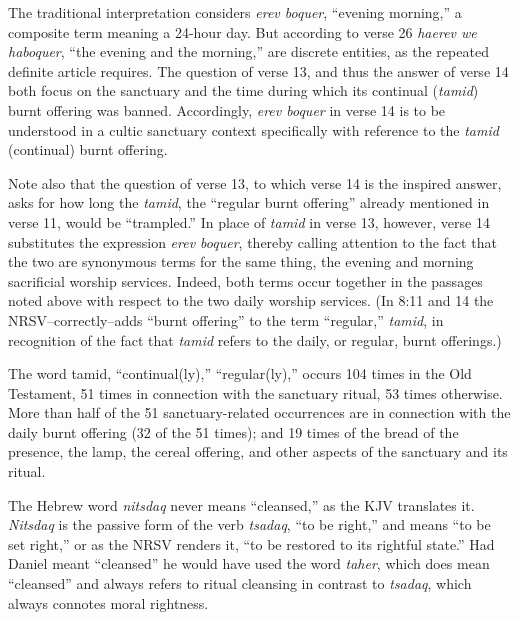 The traditional interpretation considers \textit{erev boquer}, ``evening morning,'' a
composite term meaning a 24-hour day. But according to verse 26 \textit{haerev we
haboquer}, ``the evening and the morning,'' are discrete entities, as the
repeated definite article requires. The question of verse 13, and thus the
answer of verse 14 both focus on the sanctuary and the time during which its
continual (\textit{tamid}) burnt offering was banned. Accordingly, \textit{erev boquer} in
verse 14 is to be understood in a cultic sanctuary context specifically with
reference to the \textit{tamid} (continual) burnt offering.

Note also that the question of verse 13, to which verse 14 is the inspired
answer, asks for how long the \textit{tamid}, the ``regular burnt offering'' already
mentioned in verse 11, would be ``trampled.'' In place of \textit{tamid} in verse 13, 
however, verse 14 substitutes the expression \textit{erev boquer}, thereby calling
attention to the fact that the two are synonymous terms for the same thing,
the evening and morning sacrificial worship services. Indeed, both terms
occur together in the passages noted above with respect to the two daily
worship services. (In 8:11 and 14 the NRSV--correctly--adds
``burnt offering'' to the term ``regular,'' \textit{tamid}, in recognition of the fact
that \textit{tamid} refers to the daily, or regular, burnt offerings.)

The word tamid, ``continual(ly),'' ``regular(ly),'' occurs 104 times in the Old
Testament, 51 times in connection with the sanctuary ritual, 53 times
otherwise. More than half of the 51 sanctuary-related occurrences are in
connection with the daily burnt offering (32 of the 51 times); and 19 times
of the bread of the presence, the lamp, the cereal offering, and other
aspects of the sanctuary and its ritual. 

The Hebrew word \textit{nitsdaq} never means ``cleansed,'' as the KJV translates it.
\textit{Nitsdaq} is the passive form of the verb \textit{tsadaq}, ``to be right,'' and means ``to
be set right,'' or as the NRSV renders it, ``to be restored to its rightful
state.'' Had Daniel meant ``cleansed'' he would have used the word \textit{taher}, which
does mean ``cleansed'' and always refers to ritual cleansing in contrast to
\textit{tsadaq}, which always connotes moral rightness. 

